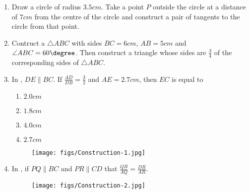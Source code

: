 \begin{enumerate}
	\item Draw a circle of radius $3.5 cm$. Take a point $P$ outside the circle at a distance of $7 cm$ from the centre of the circle and construct a pair of tangents to the circle from that point.
	\item Contruct a $\triangle ABC $ with sides $BC = 6 cm$, $AB = 5 cm$ and $\angle ABC = 60\degree$. Then construct a triangle whose sides are $\frac{3}{4}$ of the corresponding sides of $\triangle ABC$.
	\item In , $DE \parallel BC $. If $\frac{AD}{DB}=\frac{3}{2}$ and $AE = 2.7 cm$, then $EC$ is equal to
		\begin{enumerate}
		\item $2.0 cm$ 
                \item $1.8 cm$
		\item $4.0 cm$
		\item $2.7 cm$
		\end{enumerate}
		\begin{figure}[!ht]
			\begin{center}
				\texttt{[image: figs/Construction-1.jpg]}
			\end{center}
			\caption{}
			\label{fig:Construction-1.jpg}
		\end{figure}
		\newpage
	\item In , if $PQ \parallel BC$ and $PR \parallel CD$ that $\frac{QB}{AQ} = \frac{DR}{AR}$.



		\begin{figure}[!ht]
			\begin{center}
				\texttt{[image: figs/Construction-2.jpg]}
			\end{center}
			\caption{}
			\label{fig:Construction-2.jpg}
		\end{figure}
\end{enumerate}

